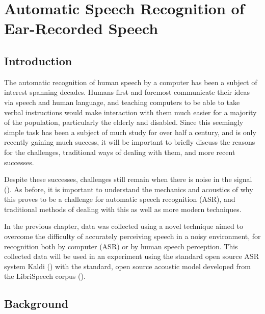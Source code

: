 \documentclass[dissertation,copyright]{uathesis}
\begin{document}



 



\chapter{Automatic Speech Recognition of Ear-Recorded Speech\label{chapter3}}


\section{Introduction}

The automatic recognition of human speech by a computer has been a subject of interest spanning decades.  Humans first and foremost communicate their ideas via speech and human language, and teaching computers to be able to take verbal instructions would make interaction with them much easier for a majority of the population, particularly the elderly and disabled.  Since this seemingly simple task has been a subject of much study for over half a century, and is only recently gaining much success, it will be important to briefly discuss the reasons for the challenges, traditional ways of dealing with them, and more recent successes.

Despite these successes, challenges still remain when there is noise in the signal (\cite{zhang:17}).  As before, it is important to understand the mechanics and acoustics of why this proves to be a challenge for automatic speech recognition (ASR), and traditional methods of dealing with this as well as more modern techniques.


In the previous chapter, data was collected using a novel technique aimed to overcome the difficulty of accurately perceiving speech in a noisy environment, for recognition both by computer (ASR) or by human speech perception.  This collected data will be used in an experiment using the standard open source ASR system Kaldi (\cite{povey:11}) with the standard, open source acoustic model developed from the LibriSpeech corpus (\cite{panayotov:15}).

\section{Background}
\label{chap3:background}
\end{document}
